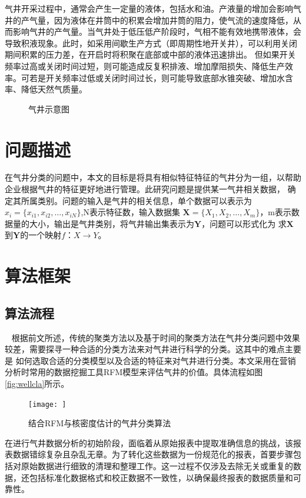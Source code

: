气井开采过程中，通常会产生一定量的液体，包括水和油。产液量的增加会影响气井的产气量，因为液体在井筒中的积累会增加井筒的阻力，使气流的速度降低，从而影响气井的产气量。当气井处于低压低产阶段时，气相不能有效地携带液体，会导致积液现象。此时，如采用间歇生产方式（即周期性地开关井），可以利用关闭期间积累的压力差，在开启时将积聚在底部或中部的液体迅速排出。
但如果开关频率过高或关闭时间过短，则可能造成反复积排液、增加摩阻损失、降低生产效率。可若是开关频率过低或关闭时间过长，则可能导致底部水锥突破、增加水含率、降低天然气质量。
\begin{figure}[H]
    \centering
    \caption{气井示意图}
\end{figure}
\section{问题描述}
在气井分类的问题中，本文的目标是将具有相似特征特征的气井分为一组，以帮助企业根据气井的特征更好地进行管理。此研究问题是提供某一气井相关数据，
确定其所属类别。问题的输入是气井的相关信息，单个数据可以表示为$x_i = \{x_{i1}, x_{i2}, \ldots, x_{iN}\}$,N表示特征数，输入数据集
$\mathbf{X} = \{X_{1}, X_{2}, \ldots, X_{m}\}$，m表示数据量的大小，输出是气井类别，将气井输出集表示为$\mathbf{Y}$，问题可以形式化为
求$\mathbf{X}$到$\mathbf{Y}$的一个映射$f$：$X \rightarrow Y$。
\section{算法框架}
\subsection{算法流程}\
\label{sec:K-Shapeprocess}
根据前文所述，传统的聚类方法以及基于时间的聚类方法在气井分类问题中效果较差，需要探寻一种合适的分类方法来对气井进行科学的分类。这其中的难点主要是
如何选取合适的分类模型以及合适的特征来对气井进行分类。本文采用在营销分析时常用的数据挖掘工具RFM模型来评估气井的价值。具体流程如图\ref{fig:wellcla}所示。
\begin{figure}
    \centering
    \texttt{[image: ]}\\
    \caption{结合RFM与核密度估计的气井分类算法}
    \label{fig:K-Shape}
\end{figure}
在进行气井数据分析的初始阶段，面临着从原始报表中提取准确信息的挑战，该报表数据错综复杂且杂乱无章。为了转化这些数据为一份规范化的报表，首要步骤包括对原始数据进行细致的清理和整理工作。这一过程不仅涉及去除无关或重复的数据，还包括标准化数据格式和校正数据不一致性，以确保最终报表的数据质量和可靠性。

